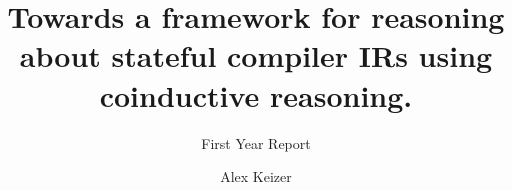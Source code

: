 \documentclass[a4paper]{article}
\begin{document}
\title{Towards a framework for reasoning about stateful compiler IRs 
using coinductive reasoning.}                                      
\subtitle{First Year Report}

\author{Alex Keizer}






\maketitle
\end{document}
